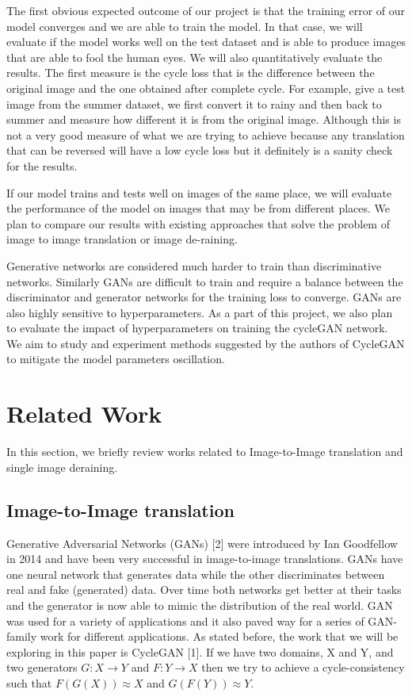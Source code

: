 \documentclass{article}
\begin{document}
The first obvious expected outcome of our project is that the training 
error of our model converges and we are able to train the model. In that 
case, we will evaluate if the model works well on the test dataset and is 
able to produce images that are able to fool the human eyes. We will also 
quantitatively evaluate the results. The first measure is the cycle loss 
that is the difference between the original image and the one obtained 
after complete cycle. For example, give a test image from the summer 
dataset, we first convert it to rainy and then back to summer and measure 
how different it is from the original image. Although this is not a very 
good measure of what we are trying to achieve because any translation that 
can be reversed will have a low cycle loss but it definitely is a sanity 
check for the results.

If our model trains and tests well on images of the same place, we will 
evaluate the performance of the model on images that may be from different 
places. We plan to compare our results with existing approaches that solve 
the problem of image to image translation or image de-raining.

Generative networks are considered much harder to train than discriminative 
networks. Similarly GANs are difficult to train and require a balance 
between the discriminator and generator networks for the training loss 
to converge. GANs are also highly sensitive to hyperparameters. 
As a part of this project, we also plan to evaluate the impact of 
hyperparameters on training the cycleGAN network. We aim to study and 
experiment methods suggested by the authors of CycleGAN to mitigate the 
model parameters oscillation.

\section{Related Work}
\label{gen_inst}

In this section, we briefly review works related to Image-to-Image translation and single image deraining.

\subsection{Image-to-Image translation}

Generative Adversarial Networks (GANs) [2] were introduced by  Ian Goodfellow in 2014 and have been very successful in image-to-image translations. GANs have one neural network that generates data while the other discriminates between real and fake (generated) data. Over time both networks get better at their tasks and the generator is now able to mimic the distribution of the real world. GAN was used for a variety of applications and it also paved way for a series of GAN-family work for different applications. As stated before, the work that we will be exploring in this paper is CycleGAN [1]. If we have two domains, X and Y, and two generators $G: X \rightarrow Y$ and $F: Y \rightarrow  X$ then we try to achieve a cycle-consistency such that $F(G(X)) \approx X$ and $G(F(Y)) \approx Y$.
\end{document}
